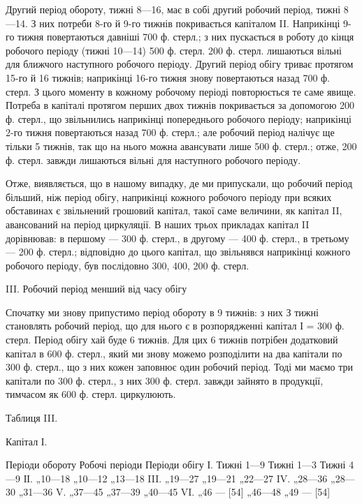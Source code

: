 Другий період обороту, тижні 8—16, має в собі другий робочий
період, тижні 8—14. З них потреби 8-го й 9-го тижнів покривається
капіталом II. Наприкінці 9-го тижня повертаються давніші 700 ф. стерл.;
з них пускається в роботу до кінця робочого періоду (тижні 10—14)
500 ф. стерл. 200 ф. стерл. лишаються вільні для ближчого наступного
робочого періоду. Другий період обігу триває протягом 15-го й 16 тижнів;
наприкінці 16-го тижня знову повертаються назад 700 ф. стерл.
З цього моменту в кожному робочому періоді повторюється те саме
явище. Потреба в капіталі протягом перших двох тижнів покривається
за допомогою 200 ф. стерл., що звільнились наприкінці попереднього
робочого періоду; наприкінці 2-го тижня повертаються назад 700 ф.
стерл.; але робочий період налічує ще тільки 5 тижнів, так що на нього
можна авансувати лише 500 ф. стерл.; отже, 200 ф. стерл. завжди лишаються
вільні для наступного робочого періоду.

Отже, виявляється, що в нашому випадку, де ми припускали, що робочий
період більший, ніж період обігу, наприкінці кожного робочого
періоду при всяких обставинах є звільнений грошовий капітал, такої
саме величини, як капітал II, авансований на період циркуляції. В наших
трьох прикладах капітал II дорівнював: в першому — 300 ф. стерл., в
другому — 400 ф. стерл., в третьому — 200 ф. стерл.; відповідно до
цього капітал, що звільнявся наприкінці кожного робочого періоду, був
послідовно 300, 400, 200 ф. стерл.

III. Робочий період менший від часу обігу

Спочатку ми знову припустимо період обороту в 9 тижнів: з них
З тижні становлять робочий період, що для нього є в розпорядженні
капітал І = 300 ф. стерл. Період обігу хай буде 6 тижнів. Для цих
6 тижнів потрібен додатковий капітал в 600 ф. стерл., який ми знову
можемо розподілити на два капітали по 300 ф. стерл., що з них кожен
заповнює один робочий період. Тоді ми маємо три капітали по 300 ф.
стерл., з них 300 ф. стерл. завжди зайнято в продукції, тимчасом як
600 ф. стерл. циркулюють.

Таблиця III.

Капітал І.

Періоди обороту    Робочі періоди    Періоди обігу
І. Тижні 1—9    Тижні 1—3    Тижні 4—9
ІІ. „10—18 „10—12 „13—18
III. „19—27 „19—21 „22—27
IV. „28—36 „28—30 „31—36
V. „37—45 „37—39 „40—45
VI. „46 — [54] „46—48 „49 — [54]
